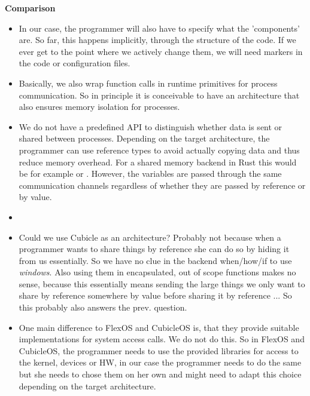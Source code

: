 \textbf{Comparison}
\begin{itemize}
    \item In our case, the programmer will also have to specify what the 'components' are. So far, this happens implicitly, through the structure of the code. If we ever get to the point where we actively change them, we will need markers in the code or configuration files. 
    \item Basically, we also wrap function calls in runtime primitives for process communication. So in principle it is conceivable to have an architecture that also ensures memory isolation for processes. 
    \item We do not have a predefined API to distinguish whether data is sent or shared between processes. Depending on the target architecture, the programmer can use reference types to avoid actually copying data and thus reduce memory overhead. For a shared memory backend in Rust this would be for example  or . However, the variables are passed through the same communication channels regardless of whether they are passed by reference or by value.
    \item {}
    \item Could we use Cubicle as an architecture? Probably not because when a programmer wants to share things by reference she can do so by hiding it from us essentially. So we have no clue in the backend when/how/if to use \emph{windows}. Also using them in encapsulated, out of scope functions makes no sense, because this essentially means sending the large things we only want to share by reference somewhere by value before sharing it  by reference ... So this probably also answers the prev. question.
    \item One main difference to FlexOS and CubicleOS is, that they provide suitable implementations for system access calls. We do not do this. So in FlexOS and CubicleOS, the programmer needs to use the provided libraries for access to the kernel, devices or HW, in our case the programmer needs to do the same but she needs to chose them on her own and might need to adapt this choice depending on the target architecture.
\end{itemize}



